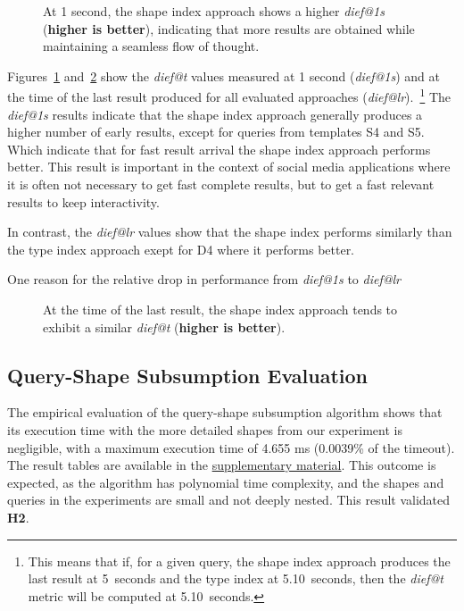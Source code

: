 \begin{figure}
    \centering
    
    \caption{At 1 second, the shape index approach shows a higher \textit{dief@1s} (\textbf{higher is better}), indicating that more results are obtained while maintaining a seamless flow of thought.}
    \label{fig:dief_1}
\end{figure}

Figures~\ref{fig:dief_1} and~\ref{fig:dief_lr} show the \textit{dief@t} values measured at 1 second (\textit{dief@1s}) and at the time of the last result produced for all evaluated approaches (\textit{dief@lr}).~\footnote{This means that if, for a given query, the shape index approach produces the last result at 5~seconds and the type index at 5.10~seconds, then the \textit{dief@t} metric will be computed at 5.10~seconds.}
The \textit{dief@1s} results indicate that the shape index approach generally produces a higher number of early results, except for queries from templates S4 and S5.
Which indicate that for fast result arrival the shape index approach performs better.
This result is important in the context of social media applications where it is often not necessary to get fast complete results, but to get a fast relevant results to keep interactivity.



In contrast, the \textit{dief@lr} values show that the shape index performs similarly than the type index approach exept for D4 where it performs better.

One reason for the relative drop in performance from \textit{dief@1s} to \textit{dief@lr}

\begin{figure}
    \centering
    
    \caption{At the time of the last result, the shape index approach tends to exhibit a similar \textit{dief@t} (\textbf{higher is better}).}
    \label{fig:dief_lr}
\end{figure}

\subsection{Query-Shape Subsumption Evaluation} \label{sec:experimentAlgoSubsumption}

The empirical evaluation of the query-shape subsumption algorithm shows that its execution time with the more detailed shapes from our experiment is negligible, with a maximum execution time of 4.655 ms (0.0039\% of the timeout).
The result tables are available in the \hyperref[sec:supplementalMaterial]{supplementary material}.
This outcome is expected, as the algorithm has polynomial time complexity, and the shapes and queries in the experiments are small and not deeply nested.
This result validated \textbf{H2}.


